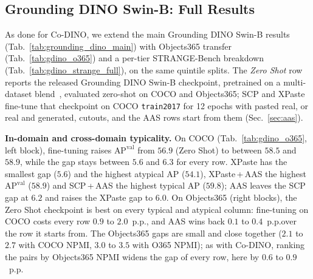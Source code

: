 \subsection{Grounding DINO Swin-B: Full Results}
\label{app:gdino_full}

As done for Co-DINO, we extend the main Grounding DINO Swin-B results (Tab.~\ref{tab:grounding_dino_main}) with Objects365 transfer (Tab.~\ref{tab:gdino_o365}) and a per-tier STRANGE-Bench breakdown (Tab.~\ref{tab:gdino_strange_full}), on the same quintile splits. The \emph{Zero Shot} row reports the released Grounding DINO Swin-B checkpoint, pretrained on a multi-dataset blend~\cite{liu2024grounding}, evaluated zero-shot on COCO and Objects365; SCP and XPaste fine-tune that checkpoint on COCO \texttt{train2017} for 12 epochs with pasted real, or real and generated, cutouts, and the AAS rows start from them (Sec.~\ref{sec:aas}).

\begin{table}[!htp]%
\centering
\footnotesize
\setlength{\tabcolsep}{4pt}
\caption{\textbf{Grounding DINO Swin-B: in-domain (COCO) and
cross-domain (Objects365) typicality.}
Fine-tuning on COCO trades Objects365 AP for COCO AP: every fine-tuned row gains $1.6$ to $2.0$~p.p.\@ on COCO val and loses $0.9$ to $2.0$~p.p.\@ on the Objects365 splits, where the Zero Shot checkpoint stays best; AAS \emph{(ours)} wins back $0.1$ to $0.4$~p.p.\@ of that loss over the row it starts from. The gap stays small on all three splits ($5.6$ to $6.3$, $2.1$ to $2.7$ and $3.0$ to $3.5$~p.p.\@). Full-annotation bbox mAP (\%) on the quintile paired splits, Objects365 val split by COCO \texttt{train2017} NPMI or by NPMI recomputed on Objects365 train (App.~\ref{app:exp-datasets}); rows as in Tab.~\ref{tab:grounding_dino_main}. Best per column in \textbf{bold}, second-best \underline{underlined}.}
\label{tab:gdino_o365}

\end{table}

\noindent\textbf{In-domain and cross-domain typicality.} On COCO (Tab.~\ref{tab:gdino_o365}, left block), fine-tuning raises $\text{AP}^{\text{val}}$ from $56.9$ (Zero Shot) to between $58.5$ and $58.9$, while the gap stays between $5.6$ and $6.3$ for every row. XPaste has the smallest gap ($5.6$) and the highest atypical AP ($54.1$), XPaste\,+\,AAS the highest $\text{AP}^{\text{val}}$ ($58.9$) and SCP\,+\,AAS the highest typical AP ($59.8$); AAS leaves the SCP gap at $6.2$ and raises the XPaste gap to $6.0$. On Objects365 (right blocks), the Zero Shot checkpoint is best on every typical and atypical column: fine-tuning on COCO costs every row $0.9$ to $2.0$~p.p.\@, and AAS wins back $0.1$ to $0.4$~p.p.\@ over the row it starts from. The Objects365 gaps are small and close together ($2.1$ to $2.7$ with COCO NPMI, $3.0$ to $3.5$ with O365 NPMI); as with Co-DINO, ranking the pairs by Objects365 NPMI widens the gap of every row, here by $0.6$ to $0.9$~p.p.\@


